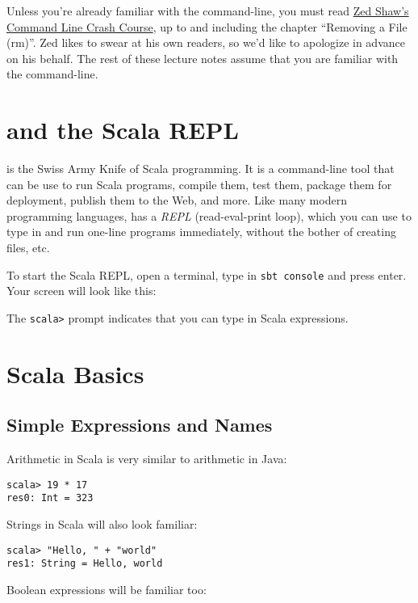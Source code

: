 \documentclass[9pt]{extbook}
\begin{document}
Unless you're already familiar with the command-line, you must read
\href{https://learnpythonthehardway.org/python3/appendixa.html}{Zed Shaw's Command Line Crash Course},
up to and including the chapter ``Removing a File (rm)''. Zed likes to swear at
his own readers, so we'd like to apologize in advance on his behalf. The rest
of these lecture notes assume that you are familiar with the command-line.

\section{\sbt{} and the Scala REPL}

\sbt{} is the Swiss Army Knife of Scala programming. It is a command-line tool
that can be use to run Scala programs, compile them, test them, package them for
deployment, publish them to the Web, and more. Like many modern programming
languages, \sbt{} has a \emph{REPL} (read-eval-print loop), which you can use to
type in and run one-line programs immediately, without the bother of creating
files, etc.

To start the Scala REPL, open a terminal,
type in \verb|sbt console| and press enter. Your screen will look like this:
%

The \verb|scala>| prompt indicates that you can type in Scala expressions.

\section{Scala Basics}

\subsection{Simple Expressions and Names}

Arithmetic in Scala is very similar to arithmetic in Java:

\lstset{language=console}
\begin{lstlisting}
scala> 19 * 17
res0: Int = 323
\end{lstlisting}

Strings in Scala will also look familiar:

\begin{lstlisting}
scala> "Hello, " + "world"
res1: String = Hello, world
\end{lstlisting}

Boolean expressions will be familiar too:
\end{document}

